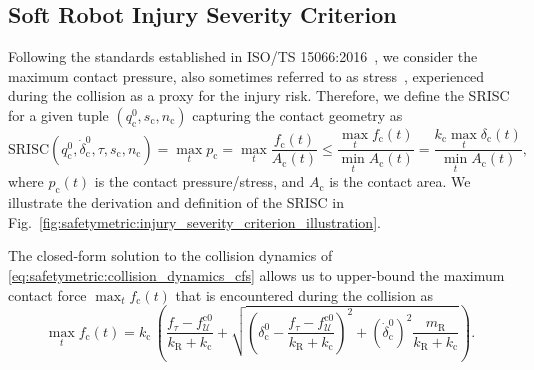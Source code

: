 \subsection{Soft Robot Injury Severity Criterion}
Following the standards established in ISO/TS 15066:2016~\citep{iso2016collaborative}, we consider the maximum contact pressure, also sometimes referred to as stress~\citep{haddadin2009requirements}, experienced during the collision as a proxy for the injury risk. Therefore, we define the \gls{SRISC} for a given tuple $(q_{\mathrm{c}}^0,s_\mathrm{c}, n_\mathrm{c})$ capturing the contact geometry as
\begin{equation}
    \mathrm{SRISC}(q_{\mathrm{c}}^0,\dot{\delta}_\mathrm{c}^0,\tau,s_\mathrm{c},n_\mathrm{c}) = \max_t p_\mathrm{c} = \max_t \frac{f_\mathrm{c}(t)}{A_\mathrm{c}(t)} \leq \frac{\max_t f_\mathrm{c}(t)}{\min_t A_\mathrm{c}(t)} =  \frac{k_\mathrm{c} \max_t \delta_\mathrm{c}(t)}{\min_t A_\mathrm{c}(t)},
\end{equation}
where $p_\mathrm{c}(t)$ is the contact pressure/stress, and $A_\mathrm{c}$ is the contact area. We illustrate the derivation and definition of the \gls{SRISC} in Fig.~\ref{fig:safetymetric:injury_severity_criterion_illustration}.

The closed-form solution to the collision dynamics of \eqref{eq:safetymetric:collision_dynamics_cfs} allows us to upper-bound the maximum contact force $\max_t f_\mathrm{c}(t)$ that is encountered during the collision as
\begin{equation}\label{eq:safetymetric:maximum_contact_force_closed_form}
     \max_{t}f_\mathrm{c}(t) = k_\mathrm{c} \, \left ( \frac{f_\tau-f_{\mathcal{U}}^{\mathrm{c}0}}{k_\mathrm{R} + k_\mathrm{c}} + \sqrt{\left ( \delta_\mathrm{c}^0 - \frac{f_\tau-f_{\mathcal{U}}^{\mathrm{c}0}}{k_\mathrm{R} + k_\mathrm{c}} \right )^2 + \left (\dot{\delta}_\mathrm{c}^0 \right )^2 \frac{m_\mathrm{R}}{k_\mathrm{R} + k_\mathrm{c}} } \right ).
\end{equation}

